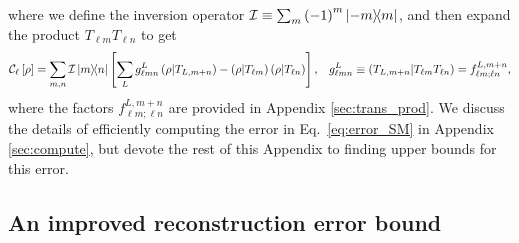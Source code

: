 \documentclass[notitlepage,twocolumn]{revtex4-2}
\newcommand{\p}[1]{\left(#1\right)} %
\renewcommand{\sp}[1]{\left[#1\right]} %
\newcommand{\C}{\mathcal{C}}
\newcommand{\I}{\mathcal{I}}
\def\obk#1{\mathinner{({#1})}}
\begin{document}
where we define the inversion operator $\I\equiv\sum_m \p{-1}^m\op{-m}{m}$, and then expand the product $T_{\ell m} T_{\ell n}$ to get
\begin{align}
  \C_\ell\sp{\rho} = \sum_{m,n} \I \op{m}{n}
  \sp{\sum_L g_{\ell mn}^L \obk{\rho|T_{L,m+n}}
    - \obk{\rho|T_{\ell m}} \obk{\rho|T_{\ell n}}},
  &&
  g_{\ell mn}^L \equiv \obk{T_{L,m+n} | T_{\ell m} T_{\ell n}}
  = f_{\ell m;\ell n}^{L,m+n},
\end{align}
where the factors $f_{\ell m;\ell n}^{L,m+n}$ are provided in Appendix \ref{sec:trans_prod}.
We discuss the details of efficiently computing the error in Eq.~\eqref{eq:error_SM} in Appendix \ref{sec:compute}, but devote the rest of this Appendix to finding upper bounds for this error.

\subsection{An improved reconstruction error bound}
\end{document}
